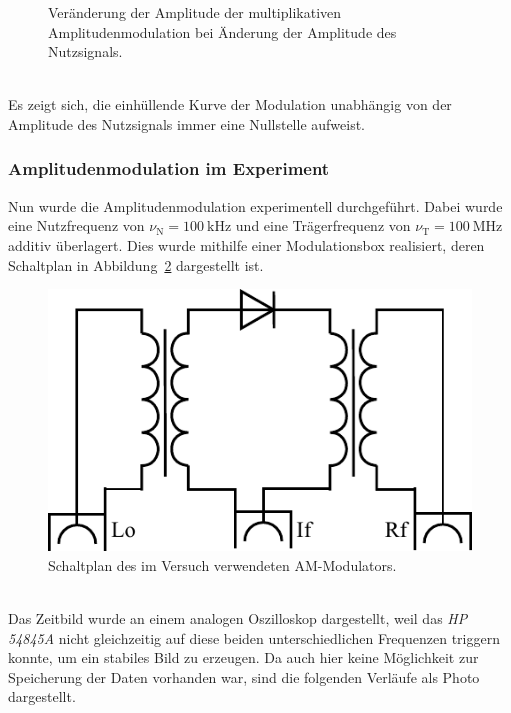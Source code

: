\documentclass[a4paper,twoside,final]{article}
\begin{document}
\begin{figure}[htp]
\begin{subfigure}{0.45\textwidth}
    \end{subfigure}
    \caption{Veränderung der Amplitude der multiplikativen Amplitudenmodulation bei Änderung der Amplitude des Nutzsignals.}
    \label{fig:AM2_multiplikativ}
\end{figure}\\
Es zeigt sich, die einhüllende Kurve der Modulation unabhängig von der Amplitude des Nutzsignals immer eine Nullstelle aufweist.
\FloatBarrier
\subsubsection{Amplitudenmodulation im Experiment}
Nun wurde die Amplitudenmodulation experimentell durchgeführt. Dabei wurde eine Nutzfrequenz von $\nu_\text{N} = \SI{100}{\kilo\hertz}$ und eine Trägerfrequenz von $\nu_\text{T} = \SI{100}{\mega\hertz}$ additiv überlagert. Dies wurde mithilfe einer Modulationsbox realisiert, deren Schaltplan in Abbildung~\ref{fig:AM_Modulator} dargestellt ist.
\begin{figure}[htp]
  \centering
  \includegraphics{Schaltungen/AM-Modulator.pdf}
  \caption{Schaltplan des im Versuch verwendeten AM-Modulators.}
  \label{fig:AM_Modulator}
\end{figure}\\
Das Zeitbild wurde an einem analogen Oszilloskop dargestellt, weil das \textit{HP 54845A} nicht gleichzeitig auf diese beiden unterschiedlichen Frequenzen triggern konnte, um ein stabiles Bild zu erzeugen. Da auch hier keine Möglichkeit zur Speicherung der Daten vorhanden war, sind die folgenden Verläufe als Photo dargestellt.
\end{document}
